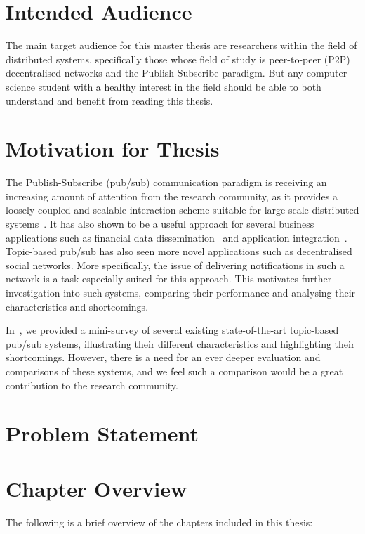 \section{Intended Audience}

The main target audience for this master thesis are researchers within
the field of distributed systems, specifically those whose field of
study is peer-to-peer (P2P) decentralised networks and the
Publish-Subscribe paradigm. But any computer science student with a
healthy interest in the field should be able to both understand and
benefit from reading this thesis.


\section{Motivation for Thesis}

The Publish-Subscribe (pub/sub) communication paradigm is receiving an
increasing amount of attention from the research community, as it
provides a loosely coupled and scalable interaction scheme suitable for
large-scale distributed systems~\cite{Eugster:2003}. It has also shown
to be a useful approach for several business applications such as
financial data dissemination~\cite{tibcorv} and application
integration~\cite{goops}.  Topic-based pub/sub has also seen more novel
applications such as decentralised social networks. More specifically,
the issue of delivering notifications in such a network is a task
especially suited for this approach. This motivates further
investigation into such systems, comparing their performance and
analysing their characteristics and shortcomings.

In~\cite{Setty:2012}, we provided a mini-survey of several existing
state-of-the-art topic-based pub/sub systems, illustrating their
different characteristics and highlighting their shortcomings. However,
there is a need for an ever deeper evaluation and comparisons of these
systems, and we feel such a comparison would be a great contribution to
the research community.

\section{Problem Statement}

\section{Chapter Overview}

The following is a brief overview of the chapters included in this
thesis:

